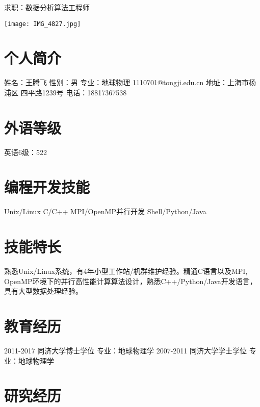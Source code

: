 \documentclass[]{friggeri-cv}
\begin{document}
       {求职：数据分析算法工程师}
\begin{aside}
\texttt{[image: IMG\_4827.jpg]}
  \section{个人简介}
   姓名：王腾飞 
   性别：男
   专业：地球物理
   1110701@tongji.edu.cn
   地址：上海市杨浦区
   四平路1239号
   电话：18817367538
  \section{外语等级}
  英语6级：522
  \section{编程开发技能}
	Unix/Linux
    C/C++
	MPI/OpenMP并行开发
    Shell/Python/Java
\end{aside}

\section{技能特长}
\large
熟悉Unix/Linux系统，有4年小型工作站/机群维护经验。精通C语言以及MPI,\\
OpenMP环境下的并行高性能计算算法设计，熟悉C++/Python/Java开发语言，\\
具有大型数据处理经验。\\

\section{教育经历}
\begin{entrylist}
  \entryTwo
    {2011-2017}
    {同济大学博士学位 \quad 专业：地球物理学}
  \entryTwo
    {2007-2011}
    {同济大学学士学位 \quad 专业：地球物理学}
\end{entrylist}

\section{研究经历}
\end{document}
